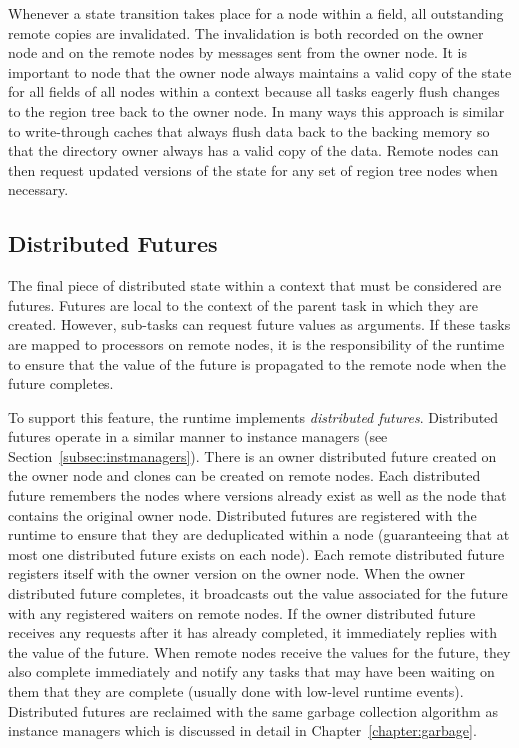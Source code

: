 Whenever a state transition takes place for a node within
a field, all outstanding remote copies are invalidated.
The invalidation is both recorded on the owner node and
on the remote nodes by messages sent from the owner node.
It is important to node that the owner node always maintains
a valid copy of the state for all fields of all nodes 
within a context because all tasks eagerly flush changes
to the region tree back to the owner node. In many ways
this approach is similar to write-through caches that always
flush data back to the backing memory so that the directory
owner always has a valid copy of the data. Remote nodes
can then request updated versions of the state for any 
set of region tree nodes when necessary.

\subsection{Distributed Futures}
\label{subsec:distfutures}

The final piece of distributed state within a context that
must be considered are futures.  Futures are local to the
context of the parent task in which they are created.
However, sub-tasks can request future values as arguments.
If these tasks are mapped to processors on remote nodes, 
it is the responsibility of the runtime to ensure that the
value of the future is propagated to the remote node
when the future completes.

To support this feature, the runtime implements {\em distributed
futures}.  Distributed futures operate in a similar manner
to instance managers (see Section~\ref{subsec:instmanagers}).
There is an owner distributed future created on the owner
node and clones can be created on remote nodes. Each
distributed future remembers the nodes where versions already
exist as well as the node that contains the original owner
node.  Distributed futures are registered with the runtime
to ensure that they are deduplicated within a node (guaranteeing
that at most one distributed future exists on each node).
Each remote distributed future registers itself with the
owner version on the owner node. When the owner distributed
future completes, it broadcasts out the value associated
for the future with any registered waiters on remote nodes.
If the owner distributed future receives any requests after
it has already completed, it immediately replies with the 
value of the future. When remote nodes receive the values
for the future, they also complete immediately and notify
any tasks that may have been waiting on them that they
are complete (usually done with low-level runtime events).
Distributed futures are reclaimed with the same garbage
collection algorithm as instance managers which is discussed
in detail in Chapter~\ref{chapter:garbage}.

